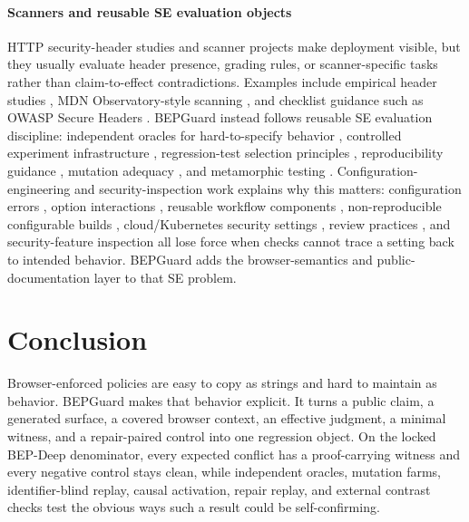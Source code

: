 \documentclass[10pt,conference]{IEEEtran}
\begin{document}
\paragraph{Scanners and reusable SE evaluation objects}
HTTP security-header studies and scanner projects make deployment visible, but they usually evaluate header presence, grading rules, or scanner-specific tasks rather than claim-to-effect contradictions. Examples include empirical header studies \cite{gadient_headers_2021,kishnani_secure_headers_2024,alashwali_https_inconsistencies_2020}, MDN Observatory-style scanning \cite{mdn_http_observatory_2026}, and checklist guidance such as OWASP Secure Headers \cite{owasp_secure_headers_2026}. BEPGuard instead follows reusable SE evaluation discipline: independent oracles for hard-to-specify behavior \cite{barr_oracle_problem_2015}, controlled experiment infrastructure \cite{do_sir_2005}, regression-test selection principles \cite{rothermel_harrold_safe_1997}, reproducibility guidance \cite{nasem_reproducibility_2019}, mutation adequacy \cite{demillo_mutation_1978,jia_harman_mutation_survey_2011}, and metamorphic testing \cite{chen_metamorphic_survey_2018}. Configuration-engineering and security-inspection work explains why this matters: configuration errors \cite{yin_config_errors_2011}, option interactions \cite{sayagh_config_engineering_2020,zhou_confinlog_2021}, reusable workflow components \cite{delicheh_js_actions_2024}, non-reproducible configurable builds \cite{randrianaina_options_matter_2024}, cloud/Kubernetes security settings \cite{shamim_kubernetes_security_config_2025}, review practices \cite{charoenwet_secure_code_reviews_2024}, and security-feature inspection \cite{hermann_security_features_2025} all lose force when checks cannot trace a setting back to intended behavior. BEPGuard adds the browser-semantics and public-documentation layer to that SE problem.

\section{Conclusion}

Browser-enforced policies are easy to copy as strings and hard to maintain as behavior. BEPGuard makes that behavior explicit. It turns a public claim, a generated surface, a covered browser context, an effective judgment, a minimal witness, and a repair-paired control into one regression object. On the locked BEP-Deep denominator, every expected conflict has a proof-carrying witness and every negative control stays clean, while independent oracles, mutation farms, identifier-blind replay, causal activation, repair replay, and external contrast checks test the obvious ways such a result could be self-confirming.
\end{document}
